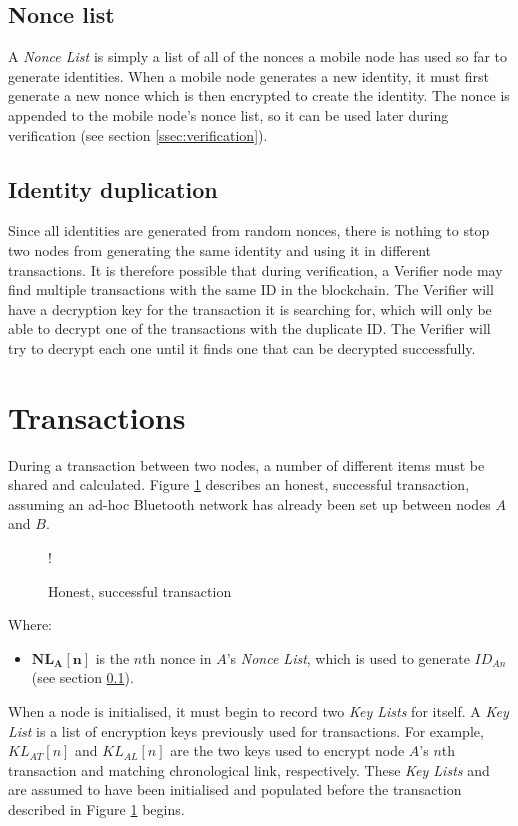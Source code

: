 \subsection{Nonce list} \label{sssec:nonce_list}
A \textit{Nonce List} is simply a list of all of the nonces a mobile node has used so far to generate identities. When a mobile node generates a new identity, it must first generate a new nonce which is then encrypted to create the identity. The nonce is appended to the mobile node's nonce list, so it can be used later during verification (see section \ref{ssec:verification}).

\subsection{Identity duplication}
Since all identities are generated from random nonces, there is nothing to stop two nodes from generating the same identity and using it in different transactions. It is therefore possible that during verification, a Verifier node may find multiple transactions with the same ID in the blockchain. The Verifier will have a decryption key for the transaction it is searching for, which will only be able to decrypt one of the transactions with the duplicate ID. The Verifier will try to decrypt each one until it finds one that can be decrypted successfully.

\newpage
\section{Transactions} \label{sec:transactions}
During a transaction between two nodes, a number of different items must be shared and calculated. Figure \ref{fig:transaction} describes an honest, successful transaction, assuming an ad-hoc Bluetooth network has already been set up between nodes $A$ and $B$.

\begin{figure}[H]
\resizebox {\columnwidth} {!} {}
\caption{Honest, successful transaction}
\label{fig:transaction}
\end{figure}

Where:
\begin{itemize}[noitemsep,topsep=0pt]
	\item[] $\mathbf{NL_A[n]}$ is the $n$th nonce in $A$'s \textit{Nonce List}, which is used to generate $ID_{An}$ (see section \ref{sssec:nonce_list}).
\end{itemize}

\null
When a node is initialised, it must begin to record two \textit{Key Lists} for itself. A \textit{Key List} is a list of encryption keys previously used for transactions. For example, $KL_{AT}[n]$ and $KL_{AL}[n]$ are the two keys used to encrypt node $A$'s $n$th transaction and matching chronological link, respectively. These \textit{Key Lists} and are assumed to have been initialised and populated before the transaction described in Figure \ref{fig:transaction} begins.

